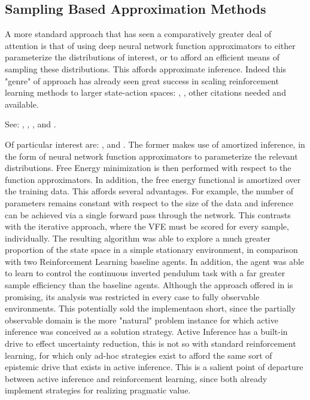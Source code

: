 \documentclass[onecolumn]{IEEEtran}
\begin{document}
\subsection{Sampling Based Approximation Methods}

A more standard approach that has seen a comparatively greater deal of attention is that of using deep neural network function approximators to either parameterize the distributions of interest, or to afford an efficient means of sampling these distributions. This affords approximate inference. Indeed this "genre" of approach has already seen great success in scaling reinforcement learning methods to larger state-action spaces: \textcite{Async-Methods-Deep-RL}, \textcite{ATARI-Deep-RL}, other citations needed and available.

See: \textcite{Deep-AIF}, \textcite{Applications-of-FEP-Machine-Learning-Neuroscience}, \textcite{Deep-AIF-As-Var-Policy-Grad}, \textcite{Reinforcement-Learning-Through-AIF} and \textcite{Bayesian-Policy-Selection-Using-AIF}. 

Of particular interest are: \textcite{Scaling-AIF}, \textcite{Bayesian-Policy-Selection-Using-AIF} and \textcite{Contrastive-AIF}. The former makes use of amortized inference, in the form of neural network function approximators to parameterize the relevant distributions. Free Energy minimization is then performed with respect to the function approximators. In addition, the free energy functional is amortized over the training data. This affords several advantages. For example, the number of parameters remains constant with respect to the size of the data and inference can be achieved via a single forward pass through the network. This contrasts with the iterative approach, where the VFE must be scored for every sample, individually. The resulting algorithm was able to explore a much greater proportion of the state space in a simple stationary environment, in comparison with two Reinforcement Learning baseline agents. In addition, the agent was able to learn to control the continuous inverted pendulum task with a far greater sample efficiency than the baseline agents. Although the approach offered in \textcite{Scaling-AIF} is promising, its analysis was restricted in every case to fully observable environments. This potentially sold the implementaon short, since the partially observable domain is the more "natural" problem instance for which active inference was conceived as a solution strategy. Active Inference has a built-in drive to effect uncertainty reduction, this is not so with standard reinforcement learning, for which only ad-hoc strategies exist to afford the same sort of epistemic drive that exists in active inference. This is a salient point of departure between active inference and reinforcement learning, since both already implement strategies for realizing pragmatic value. 
\end{document}
